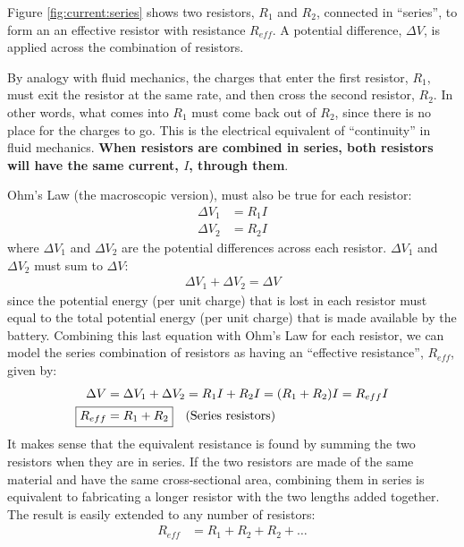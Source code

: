 Figure \ref{fig:current:series} shows two resistors, $R_1$ and $R_2$, connected in ``series'', to form an an effective resistor with resistance $R_{eff}$. A potential difference, $\Delta V$, is applied across the combination of resistors.

By analogy with fluid mechanics, the charges that enter the first resistor, $R_1$, must exit the resistor at the same rate, and then cross the second resistor, $R_2$. In other words, what comes into $R_1$ must come back out of $R_2$, since there is no place for the charges to go. This is the electrical equivalent of ``continuity'' in fluid mechanics. \textbf{When resistors are combined in series, both resistors will have the same current, $I$, through them}.

Ohm's Law (the macroscopic version), must also be true for each resistor:
\begin{align*}
\Delta V_1 &= R_1I\\
\Delta V_2 &= R_2I
\end{align*}
where $\Delta V_1$ and $\Delta V_2$ are the potential differences across each resistor. $\Delta V_1$ and $\Delta V_2$ must sum to $\Delta V$:
\begin{align*}
\Delta V_1 + \Delta V_2=\Delta V
\end{align*}
since the potential energy (per unit charge) that is lost in each resistor must equal to the total potential energy (per unit charge) that is made available by the battery. Combining this last equation with Ohm's Law for each resistor, we can model the series combination of resistors as having an ``effective resistance'', $R_{eff}$, given by:
\begin{align*}
\Delta V &= \Delta V_1 + \Delta V_2=R_1I+R_2I=(R_1+R_2)I=R_{eff}I\\
 \Aboxed{R_{eff}&=R_1+R_2}\quad \text{(Series resistors)}
\end{align*}
It makes sense that the equivalent resistance is found by summing the two resistors when they are in series. If the two resistors are made of the same material and have the same cross-sectional area, combining them in series is equivalent to fabricating a longer resistor with the two lengths added together. The result is easily extended to any number of resistors:
\begin{align*}
R_{eff}&=R_1+R_2+R_2+\dots
\end{align*}

